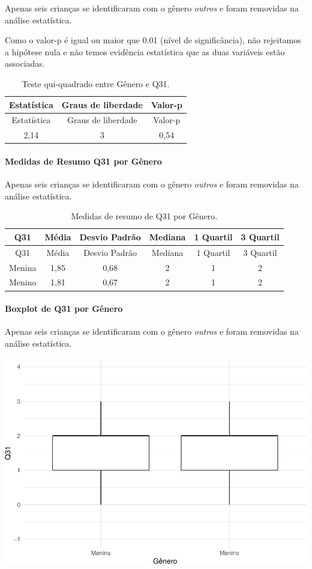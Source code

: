 \documentclass[]{article}
\let\oldparagraph\paragraph
\renewcommand{\paragraph}[1]{\oldparagraph{#1}\mbox{}}
\begin{document}
Apenas seis crianças se identificaram com o gênero \emph{outros} e foram removidas na análise estatística.

Como o valor-p é igual ou maior que 0.01 (nível de significância), não rejeitamos a hipótese nula e não temos evidência estatística que as duas variáveis estão associadas.

\begin{longtable}[]{@{}ccc@{}}
\caption{\label{tab:unnamed-chunk-1029}Teste qui-quadrado entre Gênero e Q31.}\tabularnewline
\toprule
Estatística & Graus de liberdade & Valor-p\tabularnewline
\midrule
\endfirsthead
\toprule
Estatística & Graus de liberdade & Valor-p\tabularnewline
\midrule
\endhead
2,14 & 3 & 0,54\tabularnewline
\bottomrule
\end{longtable}

\cleardoublepage

\hypertarget{medidas-de-resumo-q31-por-guxeanero}{%
\paragraph{Medidas de Resumo Q31 por Gênero}\label{medidas-de-resumo-q31-por-guxeanero}}

Apenas seis crianças se identificaram com o gênero \emph{outros} e foram removidas na análise estatística.

\begin{longtable}[]{@{}cccccc@{}}
\caption{\label{tab:unnamed-chunk-1030}Medidas de resumo de Q31 por Gênero.}\tabularnewline
\toprule
Q31 & Média & Desvio Padrão & Mediana & 1 Quartil & 3 Quartil\tabularnewline
\midrule
\endfirsthead
\toprule
Q31 & Média & Desvio Padrão & Mediana & 1 Quartil & 3 Quartil\tabularnewline
\midrule
\endhead
Menina & 1,85 & 0,68 & 2 & 1 & 2\tabularnewline
Menino & 1,81 & 0,67 & 2 & 1 & 2\tabularnewline
\bottomrule
\end{longtable}

\hypertarget{boxplot-de-q31-por-guxeanero}{%
\paragraph{Boxplot de Q31 por Gênero}\label{boxplot-de-q31-por-guxeanero}}

Apenas seis crianças se identificaram com o gênero \emph{outros} e foram removidas na análise estatística.

\begin{center}\includegraphics[width=0.75\linewidth]{relatorio_covid19_files/figure-latex/unnamed-chunk-1031-1} \end{center}
\end{document}
